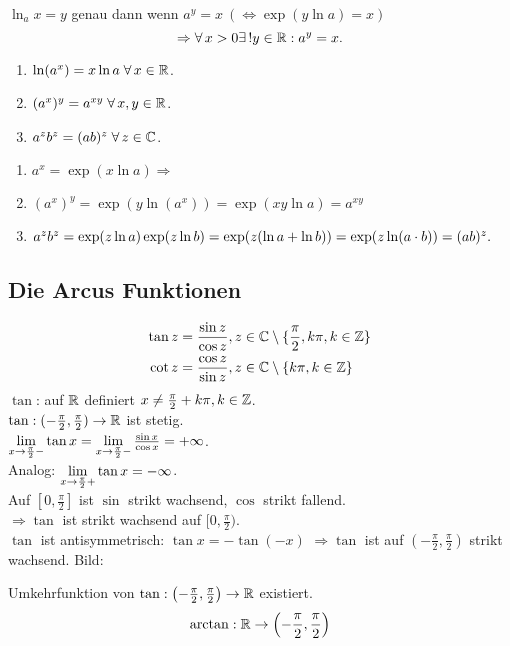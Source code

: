\documentclass[../ana2.tex]{subfiles}
\begin{document}
\begin{defi}
    \( \ln_a x = y \) genau dann wenn 
    \( a^y = x \ (\Leftrightarrow \exp(y\ln a) = x) \)
    \[ \Rightarrow \forall x > 0 \existse y \in \R: a^y = x. \]
\end{defi}
\begin{satz}\leavevmode
    \begin{enumerate}
        \item \( \ln (a^x) = x \ln a \;\forall x \in \R \).
        \item \( (a^x)^y = a^{xy} \;\forall x,y \in \R \).
        \item \( a^z b^z = (ab)^z \;\forall z\in\C \).
    \end{enumerate}
\end{satz}
\begin{bew}\leavevmode
    \begin{enumerate}
        \item \( a^x = \exp(x\ln a) \Rightarrow \)
        \item \( (a^x)^y = \exp(y\ln (a^x)) = \exp (xy \ln a)
        =a^{xy} \)
        \item \( a^z b^z = \exp(z \ln a) \exp(z \ln b) \\
        = \exp(z (\ln a + \ln b)) = \exp(z \ln(a\cdot b)) 
        = (ab)^z. \)
    \end{enumerate}
\end{bew}
\subsection*{Die Arcus Funktionen}
\begin{align*}
    \tan z &= \frac{\sin z}{\cos z}, 
    z \in \C \setminus \set{\frac{\pi}{2}, k\pi, k \in \Z} \\
    \cot z &= \frac{\cos z}{\sin z}, 
    z \in \C \setminus \set{k\pi, k \in \Z}
\end{align*}
\( \tan \): auf \( \R \) definiert 
\( x \neq \frac{\pi}{2} + k \pi, k \in \Z \).\\
\( \abb{\tan}{(- \frac{\pi}{2}, \frac{\pi}{2})}{\R}\) ist stetig.\\
\( \limesx{x}{\frac{\pi}{2}-} \tan x 
= \limesx{x}{\frac{\pi}{2}-} \frac{\sin x}{\cos x} 
= +\infty \).\\
Analog: \( \limesx{x}{\frac{\pi}{2}+} \tan x = -\infty \).\\
Auf \( [0,\frac{\pi}{2}] \) ist \( \sin \) strikt wachsend, 
\( \cos \) strikt fallend.\\
\( \Rightarrow \tan \) ist strikt wachsend auf 
\( [0,\frac{\pi}{2}) \).\\
\( \tan \) ist antisymmetrisch: \( \tan x = -\tan(-x) \)
\( \Rightarrow \tan \) ist auf 
\( (-\frac{\pi}{2},\frac{\pi}{2}) \) strikt wachsend.
Bild:
\begin{tikzpicture}
    
\end{tikzpicture}
Umkehrfunktion von 
\( \abb{\tan}{\left(-\frac{\pi}{2}, \frac{\pi}{2}\right)}{\R}\) existiert.
\[ \abb{\arctan}{\R}{\left(-\frac{\pi}{2}, \frac{\pi}{2}\right)} \]
\end{document}
